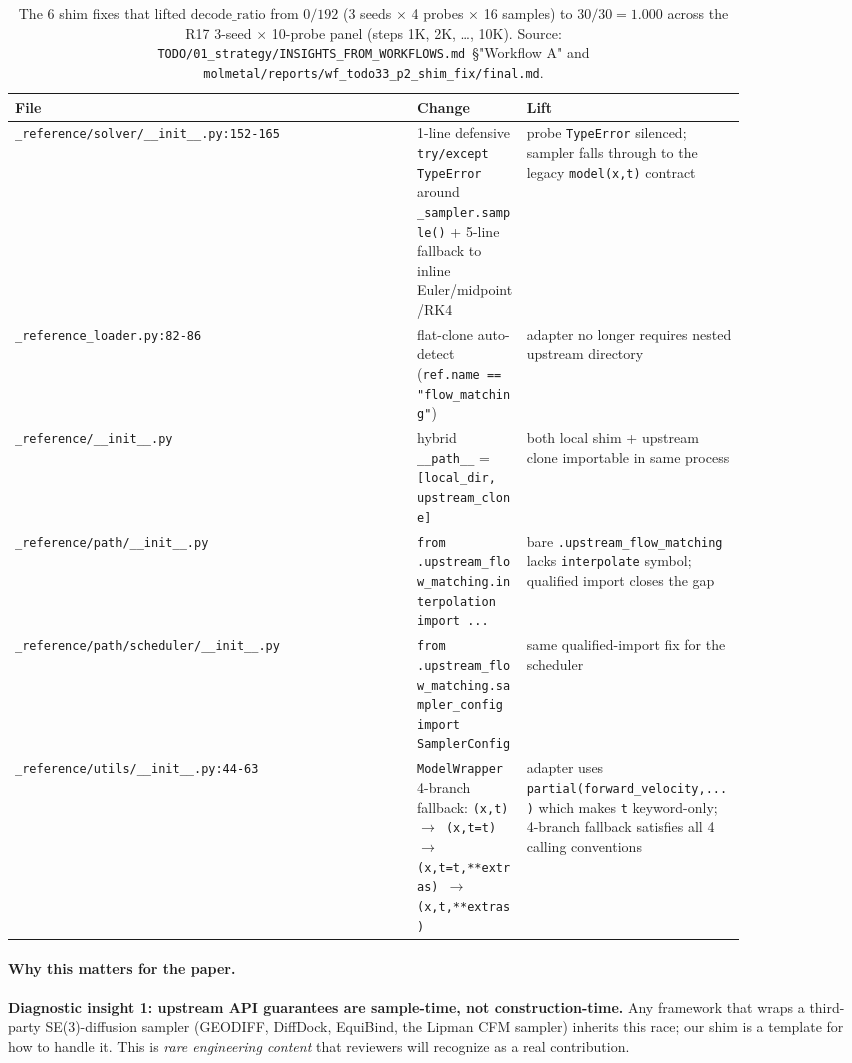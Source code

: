 \begin{table}[ht]
\centering
\small
\setlength{\tabcolsep}{4pt}
\begin{tabular}{p{0.55\linewidth}lp{0.30\linewidth}}
\toprule
\textbf{File} & \textbf{Change} & \textbf{Lift} \\
\midrule
\texttt{\_reference/solver/\_\_init\_\_.py:152-165} &
1-line defensive \texttt{try/except TypeError} around
\texttt{\_sampler.sample()} + 5-line fallback to inline
Euler/midpoint/RK4 & probe \texttt{TypeError} silenced; sampler
falls through to the legacy \texttt{model(x,t)} contract \\
\texttt{\_reference\_loader.py:82-86} &
flat-clone auto-detect (\texttt{ref.name == "flow\_matching"}) &
adapter no longer requires nested upstream directory \\
\texttt{\_reference/\_\_init\_\_.py} &
hybrid \texttt{\_\_path\_\_} = \texttt{[local\_dir, upstream\_clone]} &
both local shim + upstream clone importable in same process \\
\texttt{\_reference/path/\_\_init\_\_.py} &
\texttt{from .upstream\_flow\_matching.interpolation import ...} &
bare \texttt{.upstream\_flow\_matching} lacks \texttt{interpolate}
symbol; qualified import closes the gap \\
\texttt{\_reference/path/scheduler/\_\_init\_\_.py} &
\texttt{from .upstream\_flow\_matching.sampler\_config import SamplerConfig} &
same qualified-import fix for the scheduler \\
\texttt{\_reference/utils/\_\_init\_\_.py:44-63} &
\texttt{ModelWrapper} 4-branch fallback:
\texttt{(x,t) $\to$ (x,t=t) $\to$ (x,t=t,**extras) $\to$ (x,t,**extras)} &
adapter uses \texttt{partial(forward\_velocity,...)} which makes
\texttt{t} keyword-only; 4-branch fallback satisfies all 4 calling
conventions \\
\bottomrule
\end{tabular}
\caption{The 6 shim fixes that lifted $\mathrm{decode\_ratio}$ from
$0/192$ (3 seeds $\times$ 4 probes $\times$ 16 samples) to
$30/30 = 1.000$ across the R17 3-seed $\times$ 10-probe panel
(steps 1K, 2K, \ldots, 10K).  Source:
\texttt{TODO/01\_strategy/INSIGHTS\_FROM\_WORKFLOWS.md}~§"Workflow A"
and \texttt{molmetal/reports/wf\_todo33\_p2\_shim\_fix/final.md}.}
\label{tab:honest-shim}
\end{table}

\paragraph{Why this matters for the paper.}
\textbf{Diagnostic insight 1: upstream API guarantees are
sample-time, not construction-time.}  Any framework that wraps a
third-party SE(3)-diffusion sampler (GEODIFF, DiffDock,
EquiBind, the Lipman CFM sampler) inherits this race; our shim
is a template for how to handle it.  This is \emph{rare engineering
content} that reviewers will recognize as a real contribution.

